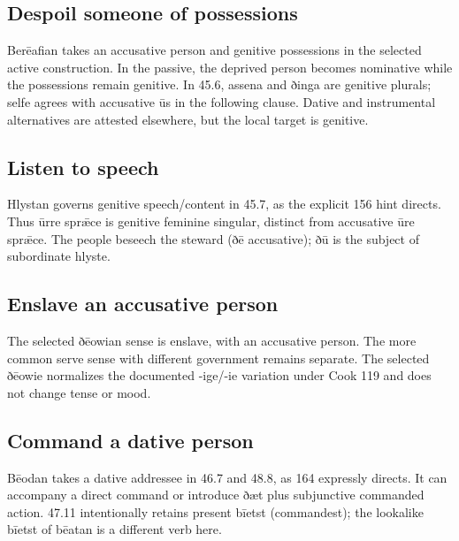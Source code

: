 \subsection*{Despoil someone of possessions}

Berēafian takes an accusative person and genitive possessions in the selected active construction. In the passive, the deprived person becomes nominative while the possessions remain genitive. In 45.6, assena and ðinga are genitive plurals; selfe agrees with accusative ūs in the following clause. Dative and instrumental alternatives are attested elsewhere, but the local target is genitive.

\subsection*{Listen to speech}

Hlystan governs genitive speech/\allowbreak{}content in 45.7, as the explicit 156 hint directs. Thus ūrre sprǣce is genitive feminine singular, distinct from accusative ūre sprǣce. The people beseech the steward (ðē accusative); ðū is the subject of subordinate hlyste.

\subsection*{Enslave an accusative person}

The selected ðēowian sense is enslave, with an accusative person. The more common serve sense with different government remains separate. The selected ðēowie normalizes the documented -ige/\allowbreak{}-ie variation under Cook 119 and does not change tense or mood.

\subsection*{Command a dative person}

Bēodan takes a dative addressee in 46.7 and 48.8, as 164 expressly directs. It can accompany a direct command or introduce ðæt plus subjunctive commanded action. 47.11 intentionally retains present bīetst (commandest); the lookalike bīetst of bēatan is a different verb here.

